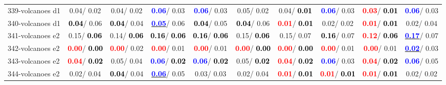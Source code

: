 \begin{table}[h]
\begin{center}
{\begin{tabular}{lc|c|c|c|c|c|c|c|c}
339-volcanoes d1 &   0.04/  0.02 &   0.04/  0.02 & \textcolor{blue}{\textbf{  0.06}}/  0.03 & \textcolor{blue}{\textbf{  0.06}}/  0.03 &   0.05/  0.02 &   0.04/\textcolor{black}{\textbf{  0.01}} & \textcolor{blue}{\textbf{  0.06}}/  0.03 & \textcolor{red}{\textbf{  0.03}}/\textcolor{black}{\textbf{  0.01}} & \textcolor{blue}{\textbf{  0.06}}/  0.03 \\
340-volcanoes d1 & \textcolor{black}{\textbf{  0.04}}/  0.06 & \textcolor{black}{\textbf{  0.04}}/  0.04 & \underline{\textcolor{blue}{\textbf{  0.05}}}/  0.06 & \textcolor{black}{\textbf{  0.04}}/  0.05 & \textcolor{black}{\textbf{  0.04}}/  0.06 & \textcolor{red}{\textbf{  0.01}}/\textcolor{black}{\textbf{  0.01}} &   0.02/  0.02 & \textcolor{red}{\textbf{  0.01}}/\textcolor{black}{\textbf{  0.01}} &   0.02/  0.04 \\
341-volcanoes e2 &   0.15/\textcolor{black}{\textbf{  0.06}} &   0.14/\textcolor{black}{\textbf{  0.06}} & \textcolor{black}{\textbf{  0.16}}/\textcolor{black}{\textbf{  0.06}} & \textcolor{black}{\textbf{  0.16}}/\textcolor{black}{\textbf{  0.06}} &   0.15/\textcolor{black}{\textbf{  0.06}} &   0.15/  0.07 & \textcolor{black}{\textbf{  0.16}}/  0.07 & \textcolor{red}{\textbf{  0.12}}/\textcolor{black}{\textbf{  0.06}} & \underline{\textcolor{blue}{\textbf{  0.17}}}/  0.07 \\ \hline
342-volcanoes e2 & \textcolor{red}{\textbf{  0.00}}/\textcolor{black}{\textbf{  0.00}} & \textcolor{red}{\textbf{  0.00}}/  0.02 & \textcolor{red}{\textbf{  0.00}}/  0.01 & \textcolor{red}{\textbf{  0.00}}/  0.01 & \textcolor{red}{\textbf{  0.00}}/\textcolor{black}{\textbf{  0.00}} & \textcolor{red}{\textbf{  0.00}}/\textcolor{black}{\textbf{  0.00}} & \textcolor{red}{\textbf{  0.00}}/  0.01 & \textcolor{red}{\textbf{  0.00}}/  0.01 & \underline{\textcolor{blue}{\textbf{  0.02}}}/  0.03 \\
343-volcanoes e2 & \textcolor{red}{\textbf{  0.04}}/\textcolor{black}{\textbf{  0.02}} &   0.05/  0.04 & \textcolor{blue}{\textbf{  0.06}}/\textcolor{black}{\textbf{  0.02}} & \textcolor{blue}{\textbf{  0.06}}/\textcolor{black}{\textbf{  0.02}} &   0.05/\textcolor{black}{\textbf{  0.02}} & \textcolor{red}{\textbf{  0.04}}/\textcolor{black}{\textbf{  0.02}} & \textcolor{blue}{\textbf{  0.06}}/  0.03 & \textcolor{red}{\textbf{  0.04}}/\textcolor{black}{\textbf{  0.02}} & \textcolor{blue}{\textbf{  0.06}}/  0.05 \\
344-volcanoes e2 &   0.02/  0.04 & \textcolor{black}{\textbf{  0.04}}/  0.04 & \underline{\textcolor{blue}{\textbf{  0.06}}}/  0.05 &   0.03/  0.03 &   0.02/  0.04 & \textcolor{red}{\textbf{  0.01}}/\textcolor{black}{\textbf{  0.01}} & \textcolor{red}{\textbf{  0.01}}/\textcolor{black}{\textbf{  0.01}} & \textcolor{red}{\textbf{  0.01}}/\textcolor{black}{\textbf{  0.01}} &   0.02/  0.02 \\

\end{tabular}}
\end{center}
\end{table}
